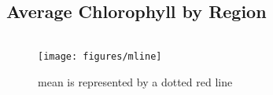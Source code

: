 \documentclass[
]{book}
\begin{document}
\hypertarget{average-chlorophyll-by-region}{%
\subsection{Average Chlorophyll by Region}\label{average-chlorophyll-by-region}}

\begin{columns-nocenter}

\begin{column}

\begin{figure}
\texttt{[image: figures/mline]} \caption{mean is represented by a dotted red line}\label{fig:unnamed-chunk-19}
\end{figure}

\end{column}

\begin{column}

\end{column}

\begin{column}

\end{column}

\end{columns-nocenter}
\end{document}
